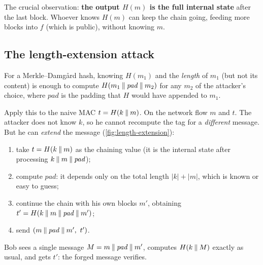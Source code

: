 The crucial observation: \textbf{the output $H(m)$ is the full internal state} after the last block. Whoever knows $H(m)$ can keep the chain going, feeding more blocks into $f$ (which is public), without knowing $m$.

\subsection{The length-extension attack}

\begin{definition}
For a Merkle--Damgård hash, knowing $H(m_1)$ and the \emph{length} of $m_1$ (but not its content) is enough to compute $H(m_1 \mathbin{\|} \mathit{pad} \mathbin{\|} m_2)$ for any $m_2$ of the attacker's choice, where $\mathit{pad}$ is the padding that $H$ would have appended to $m_1$.
\end{definition}

Apply this to the naive MAC $t = H(k \mathbin{\|} m)$. On the network flow $m$ and $t$. The attacker does not know $k$, so he cannot recompute the tag for a \emph{different} message. But he can \emph{extend} the message (\cref{fig:length-extension}):
\begin{enumerate}
    \item take $t = H(k \mathbin{\|} m)$ as the chaining value (it is the internal state after processing $k \mathbin{\|} m \mathbin{\|} \mathit{pad}$);
    \item compute $\mathit{pad}$: it depends only on the total length $|k| + |m|$, which is known or easy to guess;
    \item continue the chain with his own blocks $m'$, obtaining $t' = H(k \mathbin{\|} m \mathbin{\|} \mathit{pad} \mathbin{\|} m')$;
    \item send $(m \mathbin{\|} \mathit{pad} \mathbin{\|} m',\ t')$.
\end{enumerate}
Bob sees a single message $M = m \mathbin{\|} \mathit{pad} \mathbin{\|} m'$, computes $H(k \mathbin{\|} M)$ exactly as usual, and gets $t'$: the forged message verifies.

